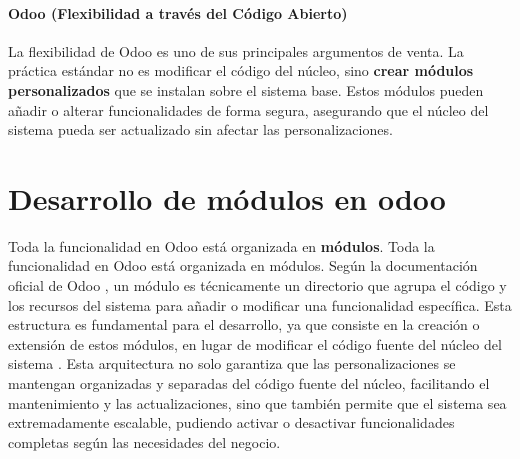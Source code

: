 \documentclass[12pt,letterpaper,spanish]{report}
\begin{document}
\paragraph{Odoo (Flexibilidad a través del Código Abierto)}
La flexibilidad de Odoo es uno de sus principales argumentos de venta. La práctica estándar no es modificar el código del núcleo, sino \textbf{crear módulos personalizados} que se instalan sobre el sistema base. Estos módulos pueden añadir o alterar funcionalidades de forma segura, asegurando que el núcleo del sistema pueda ser actualizado sin afectar las personalizaciones.

\section{Desarrollo de módulos en odoo}
\label{sec:desarrollo_modulos}

Toda la funcionalidad en Odoo está organizada en \textbf{módulos}. Toda la funcionalidad en Odoo está organizada en módulos. Según la documentación oficial de Odoo \citep{odooDocs}, un módulo es técnicamente un directorio que agrupa el código y los recursos del sistema para añadir o modificar una funcionalidad específica. Esta estructura es fundamental para el desarrollo, ya que consiste en la creación o extensión de estos módulos, en lugar de modificar el código fuente del núcleo del sistema \citep{reis2022odoo}. Esta arquitectura no solo garantiza que las personalizaciones se mantengan organizadas y separadas del código fuente del núcleo, facilitando el mantenimiento y las actualizaciones, sino que también permite que el sistema sea extremadamente escalable, pudiendo activar o desactivar funcionalidades completas según las necesidades del negocio.
\end{document}
